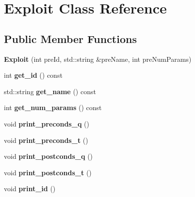 \hypertarget{class_exploit}{}\section{Exploit Class Reference}
\label{class_exploit}
\subsection*{Public Member Functions}
\begin{DoxyCompactItemize}
\item 
\mbox{\label{class_exploit_ab21f3b22cbe7a0913d790f0f0e813c51}} 
{\bfseries Exploit} (int pre\+Id, std\+::string \&pre\+Name, int pre\+Num\+Params)
\item 
\mbox{\label{class_exploit_ad008d7b416105df2caa0f7394b0604a6}} 
int {\bfseries get\+\_\+id} () const
\item 
\mbox{\label{class_exploit_a33912e2531989534aa4558460aa0eac7}} 
std\+::string {\bfseries get\+\_\+name} () const
\item 
\mbox{\label{class_exploit_ad91d38497b04903abbaffbc7f3403062}} 
int {\bfseries get\+\_\+num\+\_\+params} () const
\item 
\mbox{\label{class_exploit_a9320e46ddde5cd387703c470557449a6}} 
void {\bfseries print\+\_\+preconds\+\_\+q} ()
\item 
\mbox{\label{class_exploit_a509db4d9215f8c8f0a4964973376744a}} 
void {\bfseries print\+\_\+preconds\+\_\+t} ()
\item 
\mbox{\label{class_exploit_aa90fccd79106107ea90ab6976b3b85d9}} 
void {\bfseries print\+\_\+postconds\+\_\+q} ()
\item 
\mbox{\label{class_exploit_a2fc2e52ccadbf9d13340d2b0240a3112}} 
void {\bfseries print\+\_\+postconds\+\_\+t} ()
\item 
\mbox{\label{class_exploit_a8fddb92a42f1144697234b249c62dbf6}} 
void {\bfseries print\+\_\+id} ()
\item 
\mbox{\label{class_exploit_a26590ba99ab5bb0ee087a0c3dcd1a48c}} 

\end{DoxyCompactItemize}

